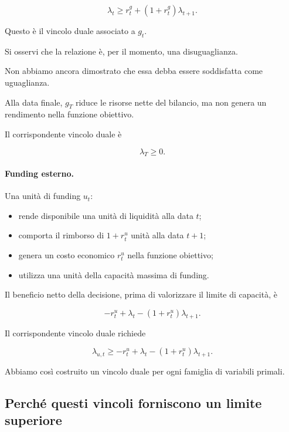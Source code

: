 \[
\boxed{
\lambda_t
\geq
r_t^g+(1+r_t^g)\lambda_{t+1}.
}
\]

Questo \`{e} il vincolo duale associato a $g_t$.

Si osservi che la relazione \`{e},
per il momento, una disuguaglianza.

Non abbiamo ancora dimostrato che essa
debba essere soddisfatta come uguaglianza.

Alla data finale, $g_T$ riduce le risorse
nette del bilancio, ma non genera un
rendimento nella funzione obiettivo.

Il corrispondente vincolo duale \`{e}

\[
\boxed{\lambda_T\geq0.}
\]

\paragraph{Funding esterno.}

Una unit\`{a} di funding $u_t$:

\begin{itemize}

\item rende disponibile una unit\`{a}
di liquidit\`{a} alla data $t$;

\item comporta il rimborso di $1+r_t^u$
unit\`{a} alla data $t+1$;

\item genera un costo economico $r_t^u$
nella funzione obiettivo;

\item utilizza una unit\`{a} della
capacit\`{a} massima di funding.

\end{itemize}

Il beneficio netto della decisione,
prima di valorizzare il limite di capacit\`{a},
\`{e}

\[
-r_t^u+\lambda_t
-(1+r_t^u)\lambda_{t+1}.
\]

Il corrispondente vincolo duale richiede

\[
\boxed{
\lambda_{u,t}
\geq
-r_t^u+\lambda_t
-(1+r_t^u)\lambda_{t+1}.
}
\]

Abbiamo cos\`{i} costruito un vincolo duale
per ogni famiglia di variabili primali.

\subsection{Perch\'{e} questi vincoli forniscono
un limite superiore}

